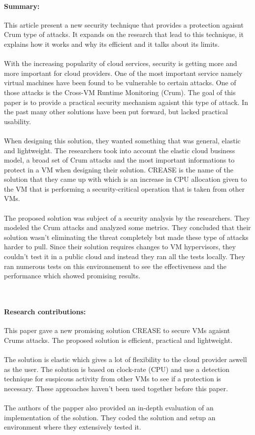 \documentclass[11pt]{article}
\begin{document}
\paragraph{Summary:} {This article present a new security technique that provides a protection agaisnt Crum type of attacks. It expands on the research that lead to this technique, it explains how it works and why its efficient and it talks about its limits.} 
\\
\\
{With the increasing popularity of cloud services, security is getting more and more important for cloud providers. One of the most important service namely virtual machines have been found to be vulnerable to certain attacks. One of those attacks is the Cross-VM Runtime Monitoring (Crum). The goal of this paper is to provide a practical security mechanism agaisnt this type of attack. In the past many other solutions have been put forward, but lacked practical usability. }
\\
\\
{When designing this solution, they wanted something that was general, elastic and lightweight. The researchers took into account the elastic cloud business model, a broad set of Crum attacks and the most important informations to protect in a VM when designing their solution. CREASE is the name of the solution that they came up with which is an increase in CPU allocation given to the VM that is performing a security-critical operation that is taken from other VMs. }
\\
\\
{The proposed solution was subject of a security analysis by the researchers. They modeled the Crum attacks and analyzed some metrics. They concluded that their solution wasn't eliminating the threat completely but made these type of attacks harder to pull. Since their solution requires changes to VM hypervisors, they couldn't test it in a public cloud and instead they ran all the tests locally. They ran numerous tests on this environnement to see the effectiveness and the performance which showed promising results. }

~\newline
\paragraph{Research contributions:} This paper gave a new promising solution CREASE to secure VMs agaisnt Crums attacks. The proposed solution is efficient, practical and lightweight.  
\\ \\
The solution is elastic which gives a lot of flexibility to the cloud provider aswell as the user. The solution is based on clock-rate (CPU) and use a detection technique for suspicous activity from other VMs to see if a protection is necessary. These approaches haven't been used together before this paper. 
\\ \\
The authors of the papper also provided an in-depth evaluation of an implementation of the solution. They coded the solution and setup an environment where they extensively tested it. 
\end{document}
